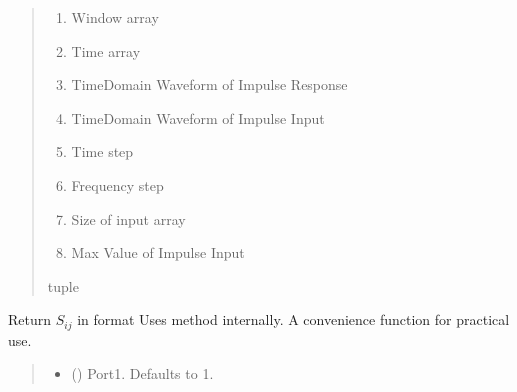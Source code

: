 \documentclass[letterpaper,10pt,english]{sphinxmanual}
\begin{document}
\begin{fulllineitems}
\begin{fulllineitems}
\begin{quote}
\begin{description}
\begin{description}
\begin{enumerate}
\item {}
\sphinxAtStartPar
Window array

\item {}
\sphinxAtStartPar
Time array

\item {}
\sphinxAtStartPar
Time\sphinxhyphen{}Domain Waveform of Impulse Response

\item {}
\sphinxAtStartPar
Time\sphinxhyphen{}Domain Waveform of Impulse Input

\item {}
\sphinxAtStartPar
Time step

\item {}
\sphinxAtStartPar
Frequency step

\item {}
\sphinxAtStartPar
Size of input array

\item {}
\sphinxAtStartPar
Max Value of Impulse Input

\end{enumerate}

\end{description}


\sphinxhyphen{}tuple

\end{description}\end{quote}

\end{fulllineitems}


\begin{fulllineitems}
\label{\detokenize{touchstone:touchstone.spfile.S}}
\pysigstartsignatures
{}
\pysigstopsignatures
\sphinxAtStartPar
Return \(S_{i j}\) in format 
Uses  method internally. A convenience function for practical use.
\begin{quote}\begin{description}
\begin{itemize}
\item {}
\sphinxAtStartPar
{} (\sphinxstyleliteralemphasis{\sphinxupquote{, }}) \textendash{} Port\sphinxhyphen{}1. Defaults to 1.


\end{itemize}
\end{description}
\end{quote}
\end{fulllineitems}
\end{fulllineitems}
\end{document}
